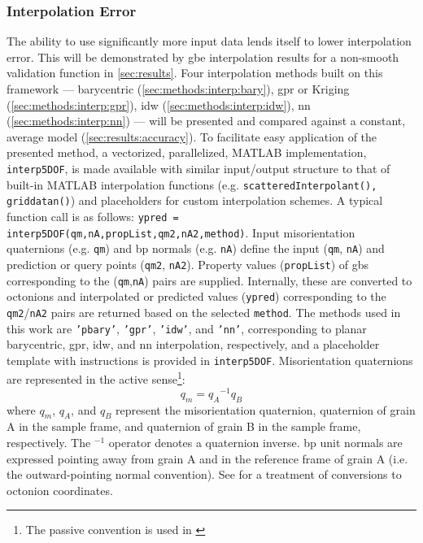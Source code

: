 \documentclass[preprint,12pt]{elsarticle}
\begin{document}
\subsubsection{Interpolation Error} \label{sec:intro:interp-error}
The ability to use significantly more input data lends itself to lower interpolation error. This will be demonstrated by \gls{gbe} interpolation results for a non-smooth validation function in \cref{sec:results}.
Four interpolation methods built on this framework --- barycentric (\cref{sec:methods:interp:bary}), \gls{gpr} or Kriging (\cref{sec:methods:interp:gpr}), \gls{idw} (\cref{sec:methods:interp:idw}), \gls{nn} (\cref{sec:methods:interp:nn}) --- will be presented and compared against a constant, average model (\cref{sec:results:accuracy}). To facilitate easy application of the presented method, a vectorized, parallelized, MATLAB implementation, \texttt{interp5DOF}, is made available \cite{bairdFiveDegreeofFreedom5DOF2020} with similar input/output structure to that of built-in MATLAB interpolation functions (e.g. \texttt{scatteredInterpolant(), griddatan()}) and placeholders for custom interpolation schemes. A typical function call is as follows: \texttt{ypred = interp5DOF(qm,nA,propList,qm2,nA2,method)}. Input misorientation quaternions (e.g. \texttt{qm}) and \gls{bp} normals (e.g. \texttt{nA}) define the input (\texttt{qm}, \texttt{nA}) and prediction or query points (\texttt{qm2}, \texttt{nA2}). Property values (\texttt{propList}) of \glspl{gb} corresponding to the (\texttt{qm},\texttt{nA}) pairs are supplied. Internally, these are converted to octonions and interpolated or predicted values (\texttt{ypred}) corresponding to the \texttt{qm2}/\texttt{nA2} pairs are returned based on the selected \texttt{method}. The methods used in this work are \texttt{'pbary'}, \texttt{'gpr'}, \texttt{'idw'}, and \texttt{'nn'}, corresponding to planar barycentric, \gls{gpr}, \gls{idw}, and \gls{nn} interpolation, respectively, and a placeholder template with instructions is provided in \texttt{interp5DOF}. Misorientation quaternions are represented in the active sense\footnote{The passive convention is used in \cite{francisGeodesicOctonionMetric2019}}:
\begin{equation}
    q_m = {q_A}^{-1}q_B
\end{equation}
where $q_m$, $q_A$, and $q_B$ represent the misorientation quaternion, quaternion of grain A in the sample frame, and quaternion of grain B in the sample frame, respectively. The $^{-1}$ operator denotes a quaternion inverse. \Gls{bp} unit normals are expressed pointing away from grain A and in the reference frame of grain A (i.e. the outward-pointing normal convention). See \cite{francisGeodesicOctonionMetric2019} for a treatment of conversions to octonion coordinates.
\end{document}
